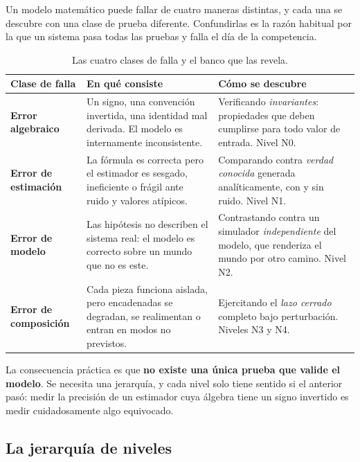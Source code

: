 \documentclass[11pt,a4paper]{article}
\begin{document}
Un modelo matemático puede fallar de cuatro maneras distintas, y cada una se
descubre con una clase de prueba diferente. Confundirlas es la razón habitual por
la que un sistema pasa todas las pruebas y falla el día de la competencia.

\begin{table}[htbp]
\centering
\small
\caption{Las cuatro clases de falla y el banco que las revela.}
\begin{tabular}{p{3.3cm}p{5.4cm}p{5.6cm}}
\toprule
Clase de falla & En qué consiste & Cómo se descubre \\
\midrule
\textbf{Error algebraico} & Un signo, una convención invertida, una identidad mal
derivada. El modelo es internamente inconsistente. & Verificando \emph{invariantes}:
propiedades que deben cumplirse para todo valor de entrada. Nivel N0. \\
\addlinespace
\textbf{Error de estimación} & La fórmula es correcta pero el estimador es sesgado,
ineficiente o frágil ante ruido y valores atípicos. & Comparando contra
\emph{verdad conocida} generada analíticamente, con y sin ruido. Nivel N1. \\
\addlinespace
\textbf{Error de modelo} & Las hipótesis no describen el sistema real: el modelo es
correcto sobre un mundo que no es este. & Contrastando contra un simulador
\emph{independiente} del modelo, que renderiza el mundo por otro camino. Nivel N2. \\
\addlinespace
\textbf{Error de composición} & Cada pieza funciona aislada, pero encadenadas se
degradan, se realimentan o entran en modos no previstos. & Ejercitando el
\emph{lazo cerrado} completo bajo perturbación. Niveles N3 y N4. \\
\bottomrule
\end{tabular}
\label{tab:clases}
\end{table}

La consecuencia práctica es que \textbf{no existe una única prueba que valide el
modelo}. Se necesita una jerarquía, y cada nivel solo tiene sentido si el anterior
pasó: medir la precisión de un estimador cuya álgebra tiene un signo invertido es
medir cuidadosamente algo equivocado.

\subsection{La jerarquía de niveles}
\end{document}

